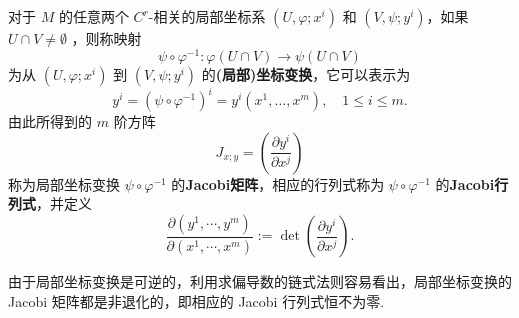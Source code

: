 对于  $M$  的任意两个  $C^r$-相关的局部坐标系  $(U, \varphi; x^i)$  和  $(V, \psi; y^i)$，如果  $U \cap V \neq \emptyset$ ，则称映射
$$
\psi \circ \varphi^ {- 1}: \varphi (U \cap V) \rightarrow \psi (U \cap V)
$$
为从  $(U,\varphi ;x^i)$  到  $(V,\psi ;y^{i})$  的{\bf (局部)坐标变换}，它可以表示为
$$
y^{i} = (\psi \circ \varphi^ {- 1}) ^ {i} = y ^ {i} (x ^ {1}, \dots , x ^ {m}), \quad 1 \leqslant i \leqslant m.
$$
由此所得到的  $m$  阶方阵
$$
J_{x; y} = \left(\frac {\partial y ^ {i}}{\partial x ^ {j}}\right)
$$
称为局部坐标变换  $\psi \circ \varphi^{-1}$  的{\bf Jacobi矩阵}，相应的行列式称为  $\psi \circ \varphi^{-1}$  的{\bf Jacobi行列式}，并定义
$$
\frac {\partial \left(y ^ {1} , \cdots , y ^ {m}\right)}{\partial \left(x ^ {1} , \cdots , x ^ {m}\right)} := \det  \left(\frac {\partial y ^ {i}}{\partial x ^ {j}}\right).
$$

由于局部坐标变换是可逆的，利用求偏导数的链式法则容易看出，局部坐标变换的 Jacobi 矩阵都是非退化的，即相应的 Jacobi 行列式恒不为零.


